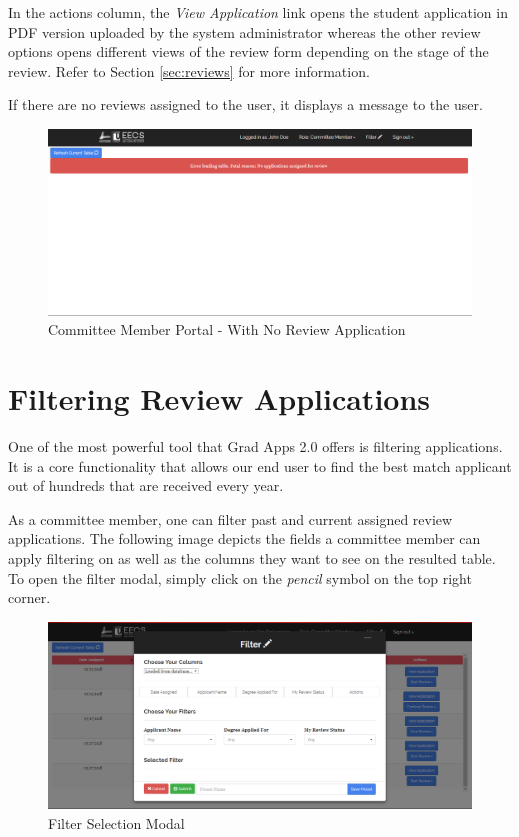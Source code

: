 \documentclass[fontsize=12pt,paper=letter,twoside]{scrartcl}
\begin{document}
\bigskip
\noindent In the actions column, the \emph{View Application} link opens the student application in PDF version uploaded by the system administrator whereas the other review options opens different views of the review form depending on the stage of the review. Refer to Section \ref{sec:reviews} for more information.

\newpage
\noindent If there are no reviews assigned to the user, it displays a message to the user.

\begin{figure}[!htb]
\begin{center}
\includegraphics[width=.9\textwidth]{images/err_default.png}
\end{center}
\caption{Committee Member Portal - With No Review Application}
\label{fig:cm_portal_err}
\end{figure}
 
\section{Filtering Review Applications}

One of the most powerful tool that Grad Apps 2.0 offers is filtering applications. It is a core functionality that allows our end user to find the best match applicant out of hundreds that are received every year.

\bigskip

\noindent As a committee member, one can filter past and current assigned review applications. The following image depicts the fields a committee member can apply filtering on as well as the columns they want to see on the resulted table. To open the filter modal, simply click on the \emph{pencil} symbol on the top right corner.

\clearpage
\begin{figure}[!htb]
\begin{center}
\includegraphics[width=.9\textwidth]{images/default_filter_view.png}
\end{center}
\caption{Filter Selection Modal}
\label{fig:def_filter_modal}
\end{figure}
\end{document}
